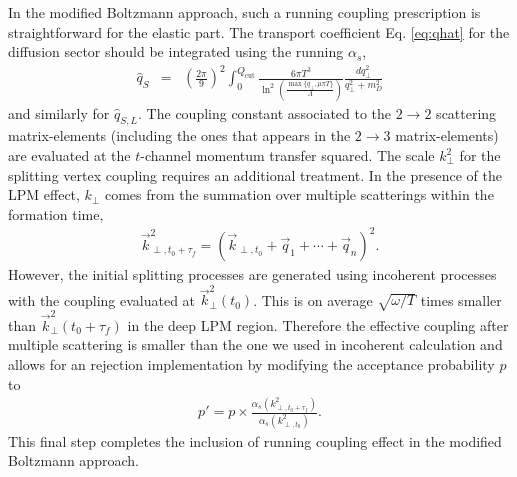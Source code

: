 \documentclass[aps, prc, reprint, amsmath, groupedaddress, nofootinbib]{revtex4-1}
\begin{document}
In the modified Boltzmann approach, such a running coupling prescription is straightforward for the elastic part.
The transport coefficient Eq. \ref{eq:qhat} for the diffusion sector should be integrated using the running $\alpha_s$,
\begin{eqnarray}
\hat{q}_S &=& \left(\frac{2\pi}{9}\right)^2\int_{0}^{Q_{\textrm{cut}}} \frac{6\pi T^3}{\ln^2\left(\frac{\max\{q_\perp, \mu\pi T\}}{\Lambda}\right)}\frac{dq_\perp^2}{q_\perp^2 + m_D^2}
\end{eqnarray}
and similarly for $\hat{q}_{S,L}$.
The coupling constant associated to the $2\rightarrow 2$ scattering matrix-elements (including the ones that appears in the $2\rightarrow 3$ matrix-elements) are evaluated at the $t$-channel momentum transfer squared.
The scale $k_\perp^2$ for the splitting vertex coupling requires an additional treatment.
In the presence of the LPM effect, $k_\perp$ comes from the summation over multiple scatterings within the formation time,
\begin{eqnarray}\label{eq:kTn}
\vec{k}_{\perp, t_0+\tau_f}^2 = \left(\vec{k}_{\perp,t_0}+\vec{q}_1+\cdots+\vec{q}_n\right)^2.
\end{eqnarray} 
However, the initial splitting processes are generated using incoherent processes with the coupling evaluated at $\vec{k}_{\perp}^2(t_0)$.
This is on average $\sqrt{\omega/T}$ times smaller than $\vec{k}_{\perp}^2(t_0+\tau_f)$ in the deep LPM region.
Therefore the effective coupling after multiple scattering is smaller than the one we used in incoherent calculation and allows for an rejection implementation by modifying the acceptance probability $p$ to
\begin{eqnarray}
p' = p\times \frac{\alpha_s(k_{\perp,t_0+\tau_f}^2)}{\alpha_s(k_{\perp,t_0}^2)}.
\end{eqnarray}
This final step completes the inclusion of running coupling effect in the modified Boltzmann approach.
\end{document}
